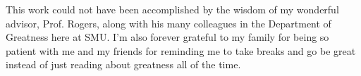 This work could not have been accomplished by the wisdom of my wonderful advisor, Prof. Rogers, along with his many colleagues in the Department of Greatness here at SMU.  I'm also forever grateful to my family for being so patient with me and my friends for reminding me to take breaks and go be great instead of just reading about greatness all of the time. 